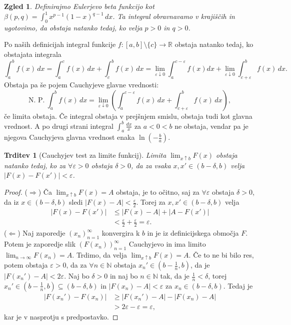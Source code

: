 \documentclass[10pt, a4paper]{article}
\newtheorem{trditev}[izr]{Trditev}
\newtheorem{zgled}{Zgled}[section]
\newenvironment{noticeC}{%
  \tcolorbox[%
  notitle,
  empty,
  enhanced,  %
  breakable,
  coltext=black, 
  fontupper=\rmfamily,
  parbox=false,
  noparskip,
  sharp corners,
  boxrule=-1pt,  %
  frame hidden,
  left=7pt,  %
  right=7pt,
  top=5pt,
  bottom=5pt,
  before skip=2.5ex plus 2pt,
  after skip=2.5ex plus 2pt,
  overlay unbroken and last={%
  },
  ]}
{\endtcolorbox}
\newenvironment{dokaz}%
  {\begin{noticeC}\begin{proof}}%
  {\end{proof}\end{noticeC}}
\newcommand{\N}{\mathbb {N}}
\newcommand{\R}{\mathbb {R}}
\newcommand{\limf}[3]{\lim_{#1 \to #2} {#3}}
\newcommand{\rlimf}[3]{\lim_{#1 \downarrow #2} {#3}}
\newcommand{\llimf}[3]{\lim_{#1 \uparrow #2} {#3}}
\begin{document}
\begin{zgled}
    Definirajmo Eulerjevo beta funkcijo kot $\beta(p, q) = \int_0 ^1 x^{p-1} (1-x)^{q-1}\,dx$.
    Ta integral obravnavamo v krajiščih in ugotovimo, da obstaja natanko tedaj, ko velja $p > 0$ in $q > 0$.
\end{zgled}

Po naših definicijah integral funkcije $f: [a, b] \setminus \{c\} \rightarrow \R$ obstaja natanko tedaj, ko obstajata integrala 
$$\int_a ^b f(x)\,dx = \int_a ^c f(x)\,dx + \int_c ^b f(x)\,dx = \rlimf{\varepsilon}{0}{\int_a ^{c-\varepsilon} f(x)dx} + \rlimf{\varepsilon}{0}{\int_{c+\varepsilon} ^b f(x)}\,dx.$$
Obstaja pa še pojem Cauchyjeve glavne vrednosti:
$$\text{N. P.}\ \int_a ^b f(x)\,dx = \rlimf{\varepsilon}{0}{\left( \int_a ^{c-\varepsilon} f(x)\,dx + \int_{c + \varepsilon} ^b f(x)\,dx \right)},$$
če limita obstaja.
Če integral obstaja v prejšnjem smislu, obstaja tudi kot glavna vrednost. A po drugi strani integral 
$\int_a ^b \frac{dx}{x}$ za $a < 0 < b$ ne obstaja, vendar pa je njegova Cauchyjeva glavna vrednost enaka $\ln \left(- \frac{b}{a} \right)$.

\begin{trditev}[Cauchyjev test za limite funkcij]
    Limita $\llimf{x}{b}{F(x)}$ obstaja natanko tedaj, ko za $\forall \varepsilon > 0$ obstaja $\delta > 0$, da za vsaka $x, x' \in (b - \delta, b)$ velja $|F(x) - F(x')| < \varepsilon$.
\end{trditev}

\begin{dokaz}
    ($\Rightarrow$) Ča $\llimf{x}{b}{F(x)} = A$ obstaja, je to očitno, saj za $\forall \varepsilon$ obstaja $\delta > 0$, da iz $x \in (b - \delta, b)$ sledi $|F(x) - A| < \frac{\varepsilon}{2}$.
    Torej za $x, x' \in (b - \delta, b)$ velja 
    \begin{align*}
        |F(x) - F(x')| & \leq |F(x) - A| + |A - F(x')|\\
        &< \frac{\varepsilon}{2} + \frac{\varepsilon}{2} = \varepsilon.
    \end{align*}
    ($\Leftarrow$) Naj zaporedje $(x_n)_{n = 1} ^{\infty}$ konvergira k $b$ in je iz definicijskega območja $F$.
    Potem je zaporedje slik $(F(x_n))_{n= 1} ^{\infty}$ Cauchyjevo in ima limito $\limf{n}{\infty}{F(x_n)} = A.$
    Trdimo, da velja $\llimf{x}{b}{F(x)} = A.$
    Če to ne bi bilo res, potem obstaja $\varepsilon > 0$, da za $\forall n \in \N$ obstaja $x_n ' \in \left( b - \frac{1}{n}, b \right)$, da je $|F(x_n ') - A| < 2 \varepsilon$.
    Naj bo $\delta > 0$ in naj bo $n \in \N$ tak, da je $\frac{1}{n} < \delta$, torej $x_n ' \in \left(b - \frac{1}{n}, b\right) \subseteq (b - \delta, b)$ in $|F(x_n) - A| < \varepsilon$ za $x_n \in (b - \delta, b)$.
    Tedaj je \begin{align*}
        |F(x_n ') - F(x_n)| &\geq |F(x_n ') - A| - |F(x_n) - A|\\
        &> 2 \varepsilon - \varepsilon = \varepsilon,
    \end{align*}
    kar je v nasprotju s predpostavko.
\end{dokaz}
\end{document}
